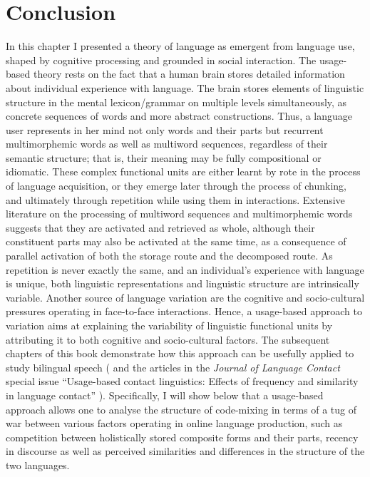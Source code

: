 \section{Conclusion}

In this chapter I presented a theory of language as emergent from language use, shaped by cognitive processing and grounded in social interaction. The usage-based theory rests on the fact that a human brain stores detailed information about individual experience with language. The brain stores elements of linguistic structure in the mental lexicon/grammar on multiple levels simultaneously, as concrete sequences of words and more abstract constructions. Thus, a language user represents in her mind not only words and their parts but recurrent multimorphemic words as well as multiword sequences, regardless of their semantic structure; that is, their meaning may be fully compositional or idiomatic. These complex functional units are either learnt by rote in the process of language acquisition, or they emerge later through the process of chunking, and ultimately through repetition while using them in interactions.  Extensive literature on the processing of multiword sequences and multimorphemic words suggests that they are activated and retrieved as whole, although their constituent parts may also be activated at the same time, as a consequence of parallel activation of both the storage route and the decomposed route. As repetition is never exactly the same, and an individual's experience with language is unique, both linguistic representations and linguistic structure are intrinsically variable. Another source of language variation are the cognitive and socio-cultural pressures operating in face-to-face interactions. Hence, a usage-based approach to variation aims at explaining the variability of linguistic functional units by attributing it to both cognitive and socio-cultural factors. The subsequent chapters of this book demonstrate how this approach can be usefully applied to study bilingual speech (\citealt[see also][]{backus-cs-15,hakimov-17} and the articles in the \textit{Journal of Language Contact} special issue “Usage-based contact linguistics: Effects of frequency and similarity in language contact” \citealt{hakimov-backus-20}). Specifically, I will show below that a usage-based approach allows one to analyse the structure of code-mixing in terms of a tug of war between various factors operating in online language production, such as competition between holistically stored composite forms and their parts, recency in discourse as well as perceived similarities and differences in the structure of the two languages.

